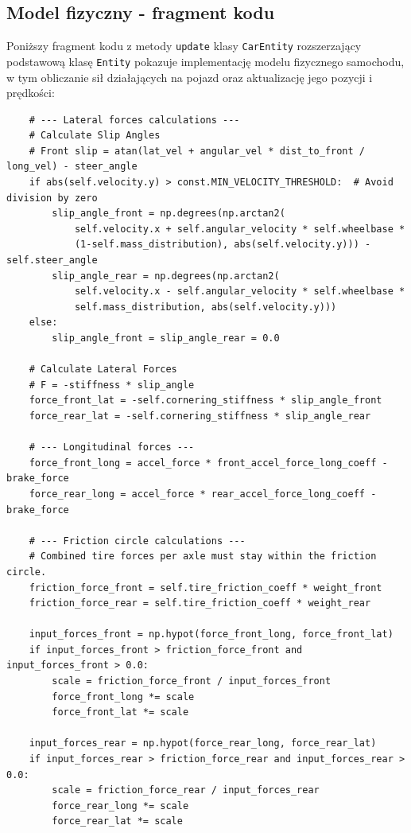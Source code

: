 \documentclass{article}
\begin{document}
\subsection{Model fizyczny - fragment kodu}
Poniższy fragment kodu z metody \texttt{update} klasy \texttt{CarEntity} rozszerzający podstawową klasę \texttt{Entity} pokazuje implementację modelu fizycznego samochodu, w tym obliczanie sił działających na pojazd oraz aktualizację jego pozycji i prędkości:
\begin{verbatim}
    # --- Lateral forces calculations ---
    # Calculate Slip Angles
    # Front slip = atan(lat_vel + angular_vel * dist_to_front / long_vel) - steer_angle
    if abs(self.velocity.y) > const.MIN_VELOCITY_THRESHOLD:  # Avoid division by zero
        slip_angle_front = np.degrees(np.arctan2(
            self.velocity.x + self.angular_velocity * self.wheelbase *
            (1-self.mass_distribution), abs(self.velocity.y))) - self.steer_angle
        slip_angle_rear = np.degrees(np.arctan2(
            self.velocity.x - self.angular_velocity * self.wheelbase *
            self.mass_distribution, abs(self.velocity.y)))
    else:
        slip_angle_front = slip_angle_rear = 0.0

    # Calculate Lateral Forces
    # F = -stiffness * slip_angle
    force_front_lat = -self.cornering_stiffness * slip_angle_front
    force_rear_lat = -self.cornering_stiffness * slip_angle_rear

    # --- Longitudinal forces ---
    force_front_long = accel_force * front_accel_force_long_coeff - brake_force
    force_rear_long = accel_force * rear_accel_force_long_coeff - brake_force

    # --- Friction circle calculations ---
    # Combined tire forces per axle must stay within the friction circle.
    friction_force_front = self.tire_friction_coeff * weight_front
    friction_force_rear = self.tire_friction_coeff * weight_rear

    input_forces_front = np.hypot(force_front_long, force_front_lat)
    if input_forces_front > friction_force_front and input_forces_front > 0.0:
        scale = friction_force_front / input_forces_front
        force_front_long *= scale
        force_front_lat *= scale

    input_forces_rear = np.hypot(force_rear_long, force_rear_lat)
    if input_forces_rear > friction_force_rear and input_forces_rear > 0.0:
        scale = friction_force_rear / input_forces_rear
        force_rear_long *= scale
        force_rear_lat *= scale


\end{verbatim}
\end{document}
